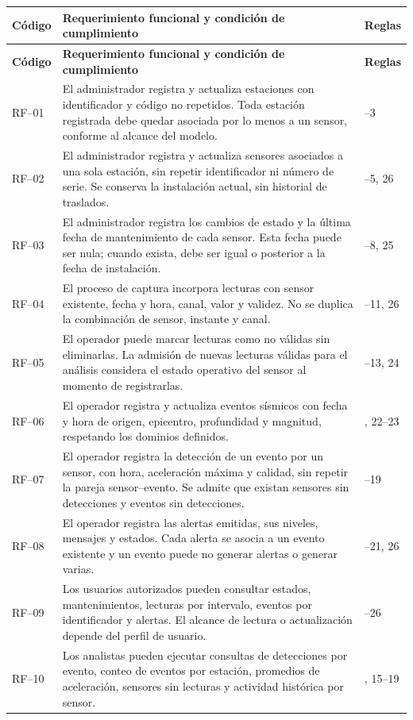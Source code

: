 \documentclass[12pt,a4paper]{article}
\begin{document}
\begin{longtable}{>{\raggedright\arraybackslash}p{1.65cm} >{\raggedright\arraybackslash}p{10.5cm} >{\raggedright\arraybackslash}p{2.1cm}}
\toprule
\textbf{Código} & \textbf{Requerimiento funcional y condición de cumplimiento} & \textbf{Reglas} \\
\midrule
\endfirsthead
\toprule
\textbf{Código} & \textbf{Requerimiento funcional y condición de cumplimiento} & \textbf{Reglas} \\
\midrule
\endhead
RF--01 & El administrador registra y actualiza estaciones con identificador y código no repetidos. Toda estación registrada debe quedar asociada por lo menos a un sensor, conforme al alcance del modelo. & 1--3 \\
RF--02 & El administrador registra y actualiza sensores asociados a una sola estación, sin repetir identificador ni número de serie. Se conserva la instalación actual, sin historial de traslados. & 3--5, 26 \\
RF--03 & El administrador registra los cambios de estado y la última fecha de mantenimiento de cada sensor. Esta fecha puede ser nula; cuando exista, debe ser igual o posterior a la fecha de instalación. & 6--8, 25 \\
RF--04 & El proceso de captura incorpora lecturas con sensor existente, fecha y hora, canal, valor y validez. No se duplica la combinación de sensor, instante y canal. & 9--11, 26 \\
RF--05 & El operador puede marcar lecturas como no válidas sin eliminarlas. La admisión de nuevas lecturas válidas para el análisis considera el estado operativo del sensor al momento de registrarlas. & 12--13, 24 \\
RF--06 & El operador registra y actualiza eventos sísmicos con fecha y hora de origen, epicentro, profundidad y magnitud, respetando los dominios definidos. & 14, 22--23 \\
RF--07 & El operador registra la detección de un evento por un sensor, con hora, aceleración máxima y calidad, sin repetir la pareja sensor--evento. Se admite que existan sensores sin detecciones y eventos sin detecciones. & 15--19 \\
RF--08 & El operador registra las alertas emitidas, sus niveles, mensajes y estados. Cada alerta se asocia a un evento existente y un evento puede no generar alertas o generar varias. & 20--21, 26 \\
RF--09 & Los usuarios autorizados pueden consultar estados, mantenimientos, lecturas por intervalo, eventos por identificador y alertas. El alcance de lectura o actualización depende del perfil de usuario. & 25--26 \\
RF--10 & Los analistas pueden ejecutar consultas de detecciones por evento, conteo de eventos por estación, promedios de aceleración, sensores sin lecturas y actividad histórica por sensor. & 9, 15--19 \\
\bottomrule
\end{longtable}
\end{document}
